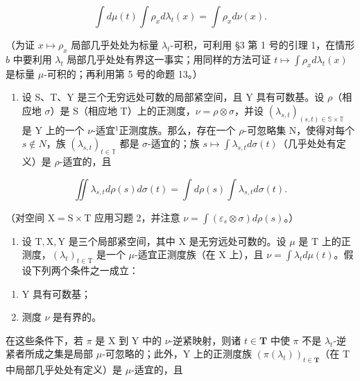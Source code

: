 \[
\int d \mu (t) \int \rho_ {x} d \lambda_ {t} (x) = \int \rho_ {x} d \nu (x).
\]

（为证 \(x \mapsto \rho_x\) 局部几乎处处为标量 \(\lambda_t\)-可积，可利用 §3 第 1 号的引理 1，在情形 \(b\) 中要利用 \(\lambda_t\) 局部几乎处处有界这一事实；用同样的方法可证 \(t \mapsto \int \rho_x d\lambda_t(x)\) 是标量 \(\mu\)-可积的；再利用第 5 号的命题 13。）

\begin{enumerate}
\def\labelenumi{\arabic{enumi})}
\setcounter{enumi}{2}
\tightlist
\item
  设 S、T、Y 是三个无穷远处可数的局部紧空间，且 Y 具有可数基。设 \(\rho\)（相应地 \(\sigma\)）是 S（相应地 T）上的正测度，\(\nu = \rho \otimes \sigma\)，并设 \((\lambda_{s,t})_{(s,t) \in \mathbb{S} \times \mathbb{T}}\) 是 Y 上的一个 \(\nu\)-适宜\(^{1}\)正测度族。那么，存在一个 \(\rho\)-可忽略集 N，使得对每个 \(s \notin N\)，族 \((\lambda_{s,t})_{t \in \mathbb{T}}\) 都是 \(\sigma\)-适宜的；族 \(s \mapsto \int \lambda_{s,t} d\sigma(t)\)（几乎处处有定义）是 \(\rho\)-适宜的，且
\end{enumerate}

\[
\iint \lambda_ {s, t} d \rho (s) d \sigma (t) = \int d \rho (s) \int \lambda_ {s, t} d \sigma (t).
\]

（对空间 \(\mathrm{X} = \mathrm{S} \times \mathrm{T}\) 应用习题 2，并注意 \(\nu = \int (\varepsilon_s \otimes \sigma) d\rho(s)\)。）

\begin{enumerate}
\def\labelenumi{\arabic{enumi})}
\setcounter{enumi}{3}
\tightlist
\item
  设 \(\mathrm{T}, \mathrm{X}, \mathrm{Y}\) 是三个局部紧空间，其中 \(\mathrm{X}\) 是无穷远处可数的。设 \(\mu\) 是 \(\mathrm{T}\) 上的正测度，\((\lambda_t)_{t \in \mathrm{T}}\) 是一个 \(\mu\)-适宜正测度族（在 \(\mathrm{X}\) 上），且 \(\nu = \int \lambda_t d\mu(t)\)。假设下列两个条件之一成立：
\end{enumerate}

\begin{enumerate}
\def\labelenumi{\alph{enumi})}
\item
  Y 具有可数基；
\item
  测度 \(\nu\) 是有界的。
\end{enumerate}

在这些条件下，若 \(\pi\) 是 X 到 Y 中的 \(\nu\)-逆紧映射，则诸 \(t \in \mathbf{T}\) 中使 \(\pi\) 不是 \(\lambda_t\)-逆紧者所成之集是局部 \(\mu\)-可忽略的；此外，Y 上的正测度族 \((\pi(\lambda_t))_{t \in \mathbf{T}}\)（在 T 中局部几乎处处有定义）是 \(\mu\)-适宜的，且

